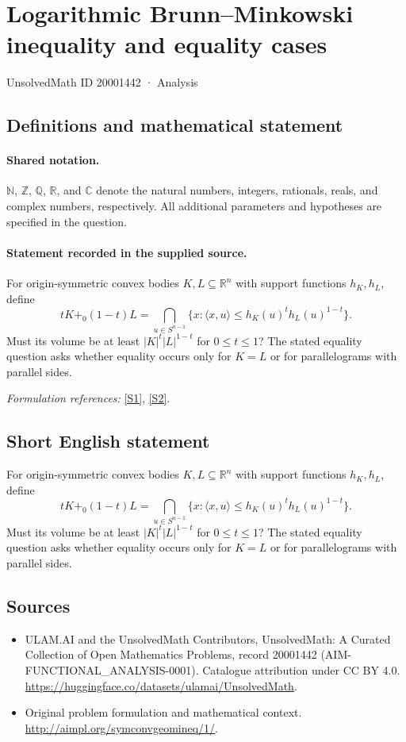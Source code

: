 \documentclass[11pt]{article}
\newcommand{\sref}[2]{\hyperlink{source:#1:#2}{[S#2]}}
\begin{document}
\setcounter{section}{20001441}
\section{Logarithmic Brunn–Minkowski inequality and equality cases}\label{20001442}
{\small UnsolvedMath ID 20001442 · Analysis}
\subsection{Definitions and mathematical statement}

\paragraph{Shared notation.}$\mathbb N$, $\mathbb Z$, $\mathbb Q$, $\mathbb R$, and $\mathbb C$ denote the natural numbers, integers, rationals, reals, and complex numbers, respectively. All additional parameters and hypotheses are specified in the question.


\paragraph{Statement recorded in the supplied source.}
For origin-symmetric convex bodies $K,L\subseteq\mathbb R^n$ with support functions $h_K,h_L$, define
\[tK+_0(1-t)L=\bigcap_{u\in S^{n-1}}\{x:\langle x,u\rangle\leq h_K(u)^th_L(u)^{1-t}\}.\]
Must its volume be at least $|K|^t|L|^{1-t}$ for $0\leq t\leq1$? The stated equality question asks whether equality occurs only for $K=L$ or for parallelograms with parallel sides.
\par\smallskip\textit{Formulation references:} \sref{20001442}{1}, \sref{20001442}{2}.
\subsection{Short English statement}
For origin-symmetric convex bodies $K,L\subseteq\mathbb R^n$ with support functions $h_K,h_L$, define
\[tK+_0(1-t)L=\bigcap_{u\in S^{n-1}}\{x:\langle x,u\rangle\leq h_K(u)^th_L(u)^{1-t}\}.\]
Must its volume be at least $|K|^t|L|^{1-t}$ for $0\leq t\leq1$? The stated equality question asks whether equality occurs only for $K=L$ or for parallelograms with parallel sides.
\subsection{Sources}
\begin{itemize}
\item[\hypertarget{source:20001442:1}{S1}] ULAM.AI and the UnsolvedMath Contributors, UnsolvedMath: A Curated Collection of Open Mathematics Problems, record 20001442 (AIM-FUNCTIONAL\_ANALYSIS-0001). Catalogue attribution under CC BY 4.0.
\url{https://huggingface.co/datasets/ulamai/UnsolvedMath}.
\item[\hypertarget{source:20001442:2}{S2}] Original problem formulation and mathematical context.
\url{http://aimpl.org/symconvgeomineq/1/}.
\end{itemize}
\label{end:20001442}
\end{document}

